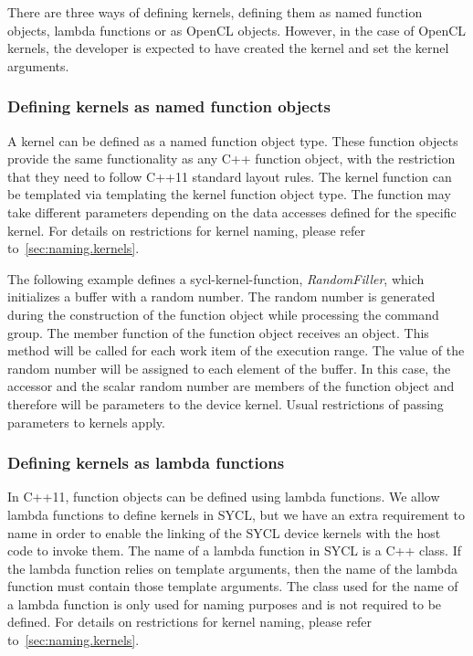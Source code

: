 There are three ways of defining kernels, defining them as named function objects,
lambda functions or as OpenCL  objects. However, in the case of
OpenCL kernels, the developer is expected to have created the kernel and set the
kernel arguments.

\subsubsection{Defining kernels as named function objects}
\label{sec:interfaces.kernels.as.function-objects}

A kernel can be defined as a named function object type. These function objects
provide the same functionality as any C++ function object, with the
restriction that they need to follow C++11 standard layout rules.
The kernel function can be templated via templating the kernel
function object type. The  function may take different
parameters depending on the data accesses defined for the
specific kernel. For details on restrictions for kernel naming,
please refer to~\ref{sec:naming.kernels}.

The following example defines a \gls{sycl-kernel-function}, \textit{RandomFiller},
which initializes a buffer with a random number. 
The random number is generated during the construction of the function 
object while processing the command group.
The  member function of the function object receives an  object.
This method will be called for each work item of the execution range.
The value of the random number will be assigned to each element of the
buffer.
In this case, the accessor and the scalar random number are members of the
function object and therefore will be parameters to the device kernel.
Usual restrictions of passing parameters to kernels apply.




\subsubsection{Defining kernels as lambda functions}
\label{sec:interfaces.kernels.as.lambdas}

In C++11, function objects can be defined using lambda functions. We allow lambda
functions to define kernels in SYCL, but we have an extra requirement to
name  in order to enable the linking of the SYCL
device kernels with the host code to invoke them. The name of a lambda function
in SYCL is a C++ class. If the lambda function relies on template arguments,
then the name of the lambda function must contain those template arguments. The
class used for the name of a lambda function is only used for naming purposes
and is not required to be defined. For details on restrictions for kernel
naming, please refer to~\ref{sec:naming.kernels}.

